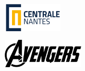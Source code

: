\newcommand{\shortmajor}{MASTER CORO-IMARO} %
\newcommand{\fullmajor}{CONTROL and ROBOTICS} %
\newcommand{\graduationyear}{2022 / 2023} %
\newcommand{\name}{FirstName LastName} %
\newcommand{\presentationdate}{31/07/2023} %
\newcommand{\topic}{Your Topic} %

\newcommand{\peoplewithposition}[2]{& #1 & #2}
\newcommand{\evaluatorone}{\peoplewithposition{Evaluator1}{Position}}
\newcommand{\evaluatortwo}{\peoplewithposition{Evaluator2}{Position}}
\newcommand{\supervisorone}{\peoplewithposition{Supervisor1}{Position}}
\newcommand{\supervisortwo}{\peoplewithposition{Supervisor2}{Position}}










\thispagestyle{empty}

\def\lskip{\vspace{0.5cm}}



\begin{minipage}[b]{0.6\linewidth}
\includegraphics[height=1.5cm, width=3.8cm]{Figures/LogoECN.png}
\end{minipage}
\begin{minipage}[b]{0.35\linewidth}
\includegraphics[height=1.5cm, width=5cm]{Figures/Logoex.png}
\end{minipage}


